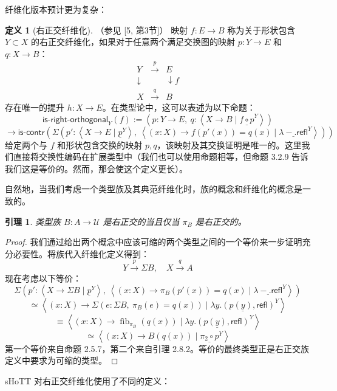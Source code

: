 \documentclass{ctexrep}
\theoremstyle{plain}
\newtheorem{lemma}[theorem]{引理}
\theoremstyle{definition}
\newtheorem{definition}[theorem]{定义}
\theoremstyle{remark}
\theoremstyle{definition}
\theoremstyle{definition}
\theoremstyle{definition}
\newcommand{\coloneqq}{\mathrel{:=}}
\newcommand{\fib}{\operatorname{fib}}
\newcommand{\refl}{\mathsf{refl}}
\newcommand{\iscontr}{\mathsf{is\text{-}contr}}
\newcommand{\UU}{\mathcal{U}}
\begin{document}
纤维化版本预计更为复杂：

\begin{definition}[右正交纤维化]（参见 [5, 第3节]）
映射 $f:E\to B$ 称为关于形状包含 $Y\subset X$ 的右正交纤维化，如果对于任意两个满足交换图的映射 $p:Y\to E$ 和 $q:X\to B$：
\[
\begin{array}{ccc}
Y & \xrightarrow{p} & E \\
\downarrow & & \downarrow{f} \\
X & \xrightarrow{q} & B
\end{array}
\]
存在唯一的提升 $h:X\to E$。在类型论中，这可以表述为以下命题：
\[
\mathsf{is\text{-}right\text{-}orthogonal}_Y(f) \coloneqq \left(p:Y\to E,\ q:\left\langle X\to B \mid \underline{f\circ p}^{Y} \right\rangle\right)
\]
\[
\to \iscontr\left( \Sigma \left(p':\left\langle X\to E \mid \underline{p}^{Y} \right\rangle,\ \left\langle (x:X)\to f(p'(x)) = q(x) \mid \underline{\lambda-.\refl}^{Y} \right\rangle \right) \right)
\]
给定两个与 $f$ 和形状包含交换的映射 $p,q$，该映射及其交换证明是唯一的。这里我们直接将交换性编码在扩展类型中（我们也可以使用命题相等，但命题 3.2.9 告诉我们这是等价的。然而，那会使这个定义更长）。
\end{definition}

自然地，当我们考虑一个类型族及其典范纤维化时，族的概念和纤维化的概念是一致的。

\begin{lemma}
类型族 $B:A\to\UU$ 是右正交的当且仅当 $\pi_B$ 是右正交的。
\end{lemma}

\begin{proof}
我们通过给出两个概念中应该可缩的两个类型之间的一个等价来一步证明充分必要性。将族代入纤维化定义得到：
\[
Y \xrightarrow{p} \Sigma B,\quad X \xrightarrow{q} A
\]
现在考虑以下等价：
\[
\Sigma \left(p':\left\langle X\to \Sigma B \mid \underline{p}^{Y} \right\rangle,\ \left\langle (x:X)\to \pi_B(p'(x)) = q(x) \mid \underline{\lambda-.\refl}^{Y} \right\rangle\right)
\]
\[
\simeq \left\langle (x:X)\to \Sigma(e:\Sigma B,\ \pi_B(e)=q(x)) \mid \underline{\lambda y.(p(y),\refl)}^{Y} \right\rangle
\]
\[
\equiv \left\langle (x:X)\to \fib_{\pi_B}(q(x)) \mid \underline{\lambda y.(p(y),\refl)}^{Y} \right\rangle
\]
\[
\simeq \left\langle (x:X)\to B(q(x)) \mid \underline{\pi_2\circ p}^{Y} \right\rangle
\]
第一个等价来自命题 2.5.7，第二个来自引理 2.8.2。等价的最终类型正是右正交族定义中要求为可缩的类型。
\end{proof}

sHoTT 对右正交纤维化使用了不同的定义：
\end{document}
